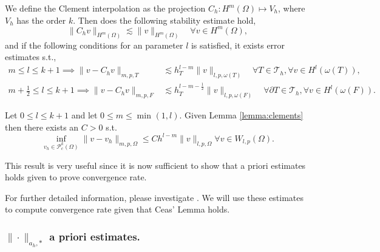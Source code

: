 \begin{lemma}
    \label{lemma:clements}

We define the Clement interpolation as the projection
$C_{h}: H^{m} \left( \Omega  \right) \mapsto V_{h}$, where $V_{h}$ has the order $k$. Then does the following stability estimate hold,
\[
 \| C_{h} v \|_{H^{m}\left( \Omega  \right)   }^{  } \lesssim \| v \|_{ H^{m}\left( \Omega  \right)  }^{  } \quad \forall v \in H^{m}\left( \Omega  \right),
\]
and if the following conditions for an parameter $l$ is satisfied, it exists error estimates s.t.,
\[
    \begin{split}
      m\le l \le k+1  \implies \| v - C_{h} v \|_{ m,p,T   }^{  }  &  \lesssim h^{l-m}_{T} \| v \|_{l,p,\omega \left( T \right)  }^{  } \quad  \forall T \in \mathcal{T} _{h}, \forall v \in H^{l}( \omega \left( T \right)
      ), \\
      m +\frac{1}{2}\le l \le k+1  \implies \| v - C_{h} v \|_{ m,p,F }^{  } & \lesssim h^{l-m- \frac{1}{2}}_{T} \| v \|_{l,p,\omega \left( F \right)  }^{  } \quad  \forall \partial T \in \mathcal{T} _{h}, \forall v \in H^{l}( \omega \left( F
      \right)).
    \end{split}
\]

\end{lemma}


\begin{corollary}
    \label{cor:celement_apriori}
    Let $0 \le l \le k+1$ and let $0\le m \le \min_{} ( 1,l )$.
    Given Lemma \ref{lemma:clements}  then there exists an $C > 0$ s.t.
    \[
    \inf_{v_{h} \in \mathcal{P} ^{k}_{c}( \Omega ) } \| v - v_{h} \|_{  m,p,\Omega }^{  } \le C h^{l-m}  \| v \|_{ l,p,\Omega  }^{  }    \forall v \in W_{l,p}( \Omega ).
    \]
\end{corollary}


This result is very useful since it is now sufficient to show that a priori estimates holds given to prove convergence rate.

For further detailed information, please investigate \cite[Chapter 1.6]{ern04}.
We will use these estimates to compute convergence rate given that Ceas' Lemma holds.


\subsubsection{$\| \cdot  \|_{ a_{h},* }^{  } $ a priori estimates.  }%
\label{ssub:extension}


